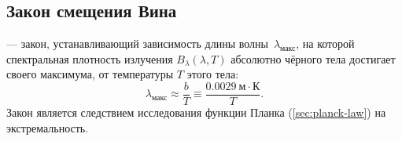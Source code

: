 \subsection{Закон смещения Вина}
 --- закон, устанавливающий зависимость длины волны~$\lambda_\text{макс}$, на которой спектральная плотность излучения $B_\lambda(\lambda, T)$ абсолютно чёрного тела достигает своего максимума, от температуры $T$ этого тела:
\begin{equation}
	\lambda_\text{макс} \approx \frac{b}{T} \equiv \frac{0.0029~\text{м} \cdot \text{К}}{T}.
\end{equation}
Закон является следствием исследования функции Планка (\ref{sec:planck-law}) на экстремальность.